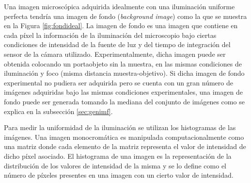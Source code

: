 Una imagen microscópica adquirida idealmente con una iluminación uniforme perfecta tendría una imagen de fondo (\textit{background image}) como la que se muestra en la Figura \ref{fig:fondideal}. La imagen de fondo es una imagen que contiene en cada píxel la información de la iluminación del microscopio bajo ciertas condiciones de intensidad de la fuente de luz y del tiempo de integración del sensor de la cámara utilizado. Experimentalmente, dicha imagen puede ser obtenida colocando un portaobjeto sin la muestra, en las mismas condiciones de iluminación y foco (misma distancia muestra-objetivo). Si dicha imagen de fondo experimental no pudiera ser adquirida pero se cuenta con un gran número de imágenes adquiridas bajo las mismas condiciones experimentales, una imagen de fondo puede ser generada tomando la mediana del conjunto de imágenes como se explica en la subsección \ref{sec:genimf}.

Para medir la uniformidad de la iluminación se utilizan los histogramas de las imágenes. Una imagen monocromática es manipulada computacionalmente como una matriz donde cada elemento de la matriz representa el valor de intensidad de dicho píxel asociado. El histograma de una imagen es la representación de la distribución de los valores de intensidad de la misma y se lo define como el número de píxeles presentes en una imagen con un cierto valor de intensidad.

